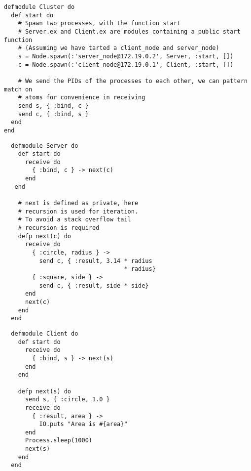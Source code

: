 \begin{verbatim}
defmodule Cluster do
  def start do 
    # Spawn two processes, with the function start
    # Server.ex and Client.ex are modules containing a public start function
    # (Assuming we have tarted a client_node and server_node)
    s = Node.spawn(:'server_node@172.19.0.2', Server, :start, []) 
    c = Node.spawn(:'client_node@172.19.0.1', Client, :start, [])

    # We send the PIDs of the processes to each other, we can pattern match on 
    # atoms for convenience in receiving
    send s, { :bind, c }
    send c, { :bind, s }
  end
end
\end{verbatim}
\noindent
\begin{minipage}{.5\textwidth}
  \begin{verbatim}
  defmodule Server do
    def start do
      receive do
        { :bind, c } -> next(c) 
      end
   end
  
    # next is defined as private, here 
    # recursion is used for iteration. 
    # To avoid a stack overflow tail 
    # recursion is required
    defp next(c) do
      receive do
        { :circle, radius } -> 
          send c, { :result, 3.14 * radius 
                                  * radius}
        { :square, side } -> 
          send c, { :result, side * side}
      end
      next(c)
    end
  end
  \end{verbatim}
\end{minipage}
\begin{minipage}{.5\textwidth}
  \begin{verbatim}
  defmodule Client do
    def start do 
      receive do 
        { :bind, s } -> next(s) 
      end
    end
  
    defp next(s) do
      send s, { :circle, 1.0 }
      receive do 
        { :result, area } -> 
          IO.puts "Area is #{area}"
      end
      Process.sleep(1000) 
      next(s)
    end
  end





  \end{verbatim}  
\end{minipage}

